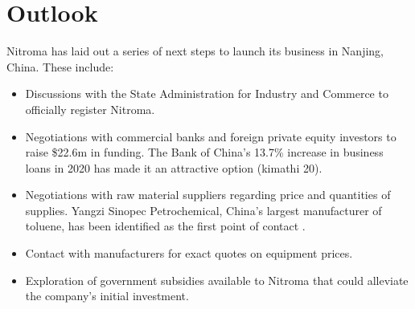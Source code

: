 \section{Outlook}
Nitroma has laid out a series of next steps to launch its business in Nanjing, China. These include:
\begin{itemize}
    \item Discussions with the State Administration for Industry and Commerce to officially register Nitroma.
    \item Negotiations with commercial banks and foreign private equity investors to raise \$22.6m in funding. The Bank of China’s 13.7\% increase in business loans in 2020 has made it an attractive option (kimathi 20).
    \item Negotiations with raw material suppliers regarding price and quantities of supplies. Yangzi Sinopec Petrochemical, China’s largest manufacturer of toluene, has been identified as the first point of contact \cite{sinopec_group_sinopec_2014}.
    \item Contact with manufacturers for exact quotes on equipment prices.
    \item Exploration of government subsidies available to Nitroma that could alleviate the company’s initial investment. 
\end{itemize}




